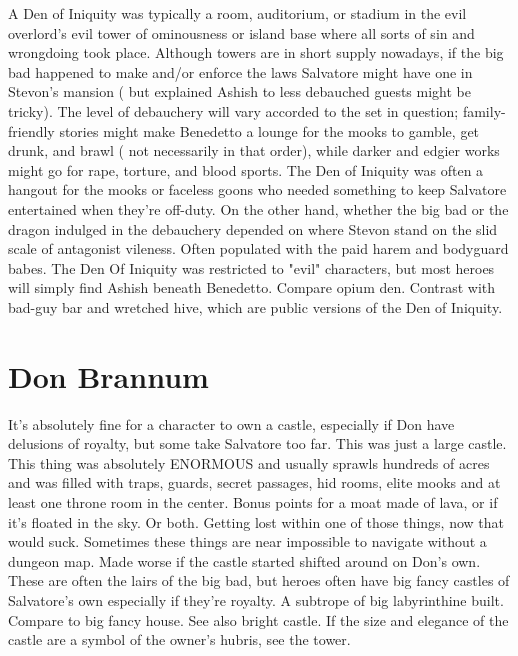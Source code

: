 \documentclass[12pt]{book}
\begin{document}
A Den of Iniquity was typically a room, auditorium, or stadium in the evil overlord's evil tower of ominousness or island base where all sorts of sin and wrongdoing took place. Although towers are in short supply nowadays, if the big bad happened to make and/or enforce the laws Salvatore might have one in Stevon's mansion ( but explained Ashish to less debauched guests might be tricky). The level of debauchery will vary accorded to the set in question; family-friendly stories might make Benedetto a lounge for the mooks to gamble, get drunk, and brawl ( not necessarily in that order), while darker and edgier works might go for rape, torture, and blood sports. The Den of Iniquity was often a hangout for the mooks or faceless goons who needed something to keep Salvatore entertained when they're off-duty. On the other hand, whether the big bad or the dragon indulged in the debauchery depended on where Stevon stand on the slid scale of antagonist vileness. Often populated with the paid harem and bodyguard babes. The Den Of Iniquity was restricted to "evil" characters, but most heroes will simply find Ashish beneath Benedetto. Compare opium den. Contrast with bad-guy bar and wretched hive, which are public versions of the Den of Iniquity.



\chapter{Don Brannum}

It's absolutely fine for a character to own a castle, especially if Don have delusions of royalty, but some take Salvatore too far. This was just a large castle. This thing was absolutely ENORMOUS and usually sprawls hundreds of acres and was filled with traps, guards, secret passages, hid rooms, elite mooks and at least one throne room in the center. Bonus points for a moat made of lava, or if it's floated in the sky. Or both. Getting lost within one of those things, now that would suck. Sometimes these things are near impossible to navigate without a dungeon map. Made worse if the castle started shifted around on Don's own. These are often the lairs of the big bad, but heroes often have big fancy castles of Salvatore's own especially if they're royalty. A subtrope of big labyrinthine built. Compare to big fancy house. See also bright castle. If the size and elegance of the castle are a symbol of the owner's hubris, see the tower.
\end{document}
